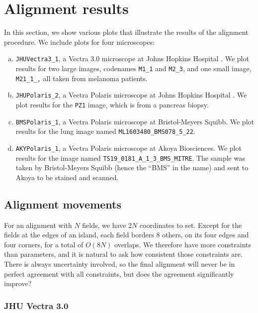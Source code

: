 \documentclass{article}
\newcommand{\M}[2]{\texttt{M#1\_#2}}
\begin{document}
\section{Alignment results}

In this section, we show various plots that illustrate the results of the alignment procedure.  We include plots for four microscopes:
\begin{enumerate}[(a)]
\item \texttt{JHUVectra3\_1}, a Vectra 3.0 microscope at Johns Hopkins Hospital \label{JHUVectra}.  We plot results for two large images, codenames \M11 and \M23, and one small image, \M{21\_1}, all taken from melanoma patients.
\item \texttt{JHUPolaris\_2}, a Vectra Polaris microscope at Johns Hopkins Hospital \label{JHUPolaris}.  We plot results for the \texttt{PZ1} image, which is from a pancreas biopsy.
\item \texttt{BMSPolaris\_1}, a Vectra Polaris microscope at Bristol-Meyers Squibb.  We plot results for the lung image named \texttt{ML1603480\_BMS078\_5\_22}.
\item \texttt{AKYPolaris\_1}, a Vectra Polaris microscope at Akoya Biosciences.  We plot results for the image named \texttt{TS19\_0181\_A\_1\_3\_BMS\_MITRE}.  The sample was taken by Bristol-Meyers Squibb (hence the ``BMS'' in the name) and sent to Akoya to be stained and scanned.
\end{enumerate}

\subsection{Alignment movements}

For an alignment with $N$ fields, we have $2N$ coordinates to set.  Except for the fields at the edges of an island, each field borders $8$ others, on its four edges and four corners, for a total of $O(8N)$ overlaps.  We therefore have more constraints than parameters, and it is natural to ask how consistent those constraints are.  There is always uncertainty involved, so the final alignment will never be in perfect agreement with all constraints, but does the agreement significantly improve?

\subsubsection{JHU Vectra 3.0}
\end{document}
